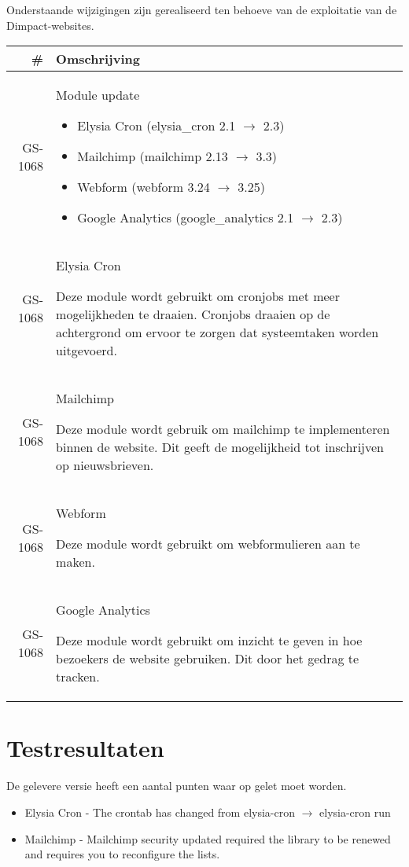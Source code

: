 \documentclass[12pt]{article}
\begin{document}
Onderstaande wijzigingen zijn gerealiseerd ten behoeve van de exploitatie van de Dimpact-websites.

\begin{tabular}{| r | p{15cm} |}
  \hline \# & Omschrijving \\ \hline
  GS-1068 & Module update
  \begin{itemize}
    \item Elysia Cron (elysia\_cron 2.1 $\rightarrow$ 2.3)
    \item Mailchimp (mailchimp 2.13 $\rightarrow$ 3.3)
    \item Webform (webform 3.24 $\rightarrow$ 3.25)
    \item Google Analytics (google\_analytics 2.1 $\rightarrow$ 2.3)
  \end{itemize} \\ \hline
  GS-1068 & Elysia Cron

  Deze module wordt gebruikt om cronjobs met meer mogelijkheden te draaien. Cronjobs draaien op de achtergrond om ervoor te zorgen dat systeemtaken worden uitgevoerd. \\ \hline
  GS-1068 & Mailchimp

  Deze module wordt gebruik om mailchimp te implementeren binnen de website. Dit geeft de mogelijkheid tot inschrijven op nieuwsbrieven. \\ \hline
  GS-1068 & Webform

  Deze module wordt gebruikt om webformulieren aan te maken. \\ \hline
  GS-1068 & Google Analytics

  Deze module wordt gebruikt om inzicht te geven in hoe bezoekers de website gebruiken. Dit door het gedrag te tracken. \\ \hline
\end{tabular}

\section{Testresultaten}
  De gelevere versie heeft een aantal punten waar op gelet moet worden.
  \begin{itemize}
    \item Elysia Cron - The crontab has changed from elysia-cron $\rightarrow$ elysia-cron run
    \item Mailchimp - Mailchimp security updated required the library to be renewed and requires you to reconfigure the lists.
  \end{itemize}
\end{document}

